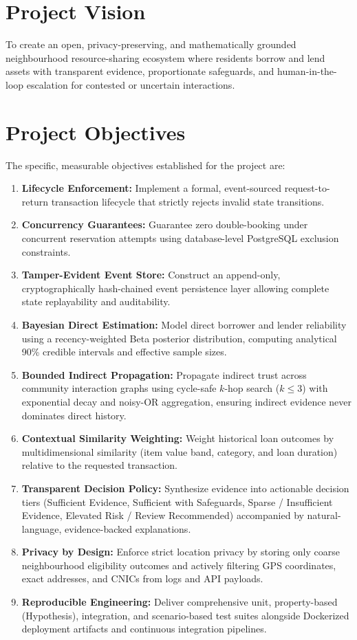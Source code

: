 \section{Project Vision}
To create an open, privacy-preserving, and mathematically grounded neighbourhood resource-sharing ecosystem where residents borrow and lend assets with transparent evidence, proportionate safeguards, and human-in-the-loop escalation for contested or uncertain interactions.

\section{Project Objectives}
The specific, measurable objectives established for the project are:
\begin{enumerate}
    \item \textbf{Lifecycle Enforcement:} Implement a formal, event-sourced request-to-return transaction lifecycle that strictly rejects invalid state transitions.
    \item \textbf{Concurrency Guarantees:} Guarantee zero double-booking under concurrent reservation attempts using database-level PostgreSQL exclusion constraints.
    \item \textbf{Tamper-Evident Event Store:} Construct an append-only, cryptographically hash-chained event persistence layer allowing complete state replayability and auditability.
    \item \textbf{Bayesian Direct Estimation:} Model direct borrower and lender reliability using a recency-weighted Beta posterior distribution, computing analytical 90\% credible intervals and effective sample sizes.
    \item \textbf{Bounded Indirect Propagation:} Propagate indirect trust across community interaction graphs using cycle-safe $k$-hop search ($k \le 3$) with exponential decay and noisy-OR aggregation, ensuring indirect evidence never dominates direct history.
    \item \textbf{Contextual Similarity Weighting:} Weight historical loan outcomes by multidimensional similarity (item value band, category, and loan duration) relative to the requested transaction.
    \item \textbf{Transparent Decision Policy:} Synthesize evidence into actionable decision tiers (Sufficient Evidence, Sufficient with Safeguards, Sparse / Insufficient Evidence, Elevated Risk / Review Recommended) accompanied by natural-language, evidence-backed explanations.
    \item \textbf{Privacy by Design:} Enforce strict location privacy by storing only coarse neighbourhood eligibility outcomes and actively filtering GPS coordinates, exact addresses, and CNICs from logs and API payloads.
    \item \textbf{Reproducible Engineering:} Deliver comprehensive unit, property-based (Hypothesis), integration, and scenario-based test suites alongside Dockerized deployment artifacts and continuous integration pipelines.
\end{enumerate}


